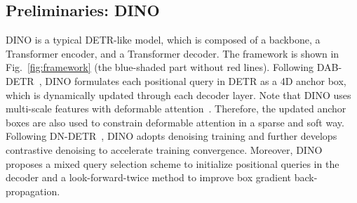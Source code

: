 \documentclass[10pt,twocolumn,letterpaper]{article}
\begin{document}
\subsection{Preliminaries: DINO}
DINO is a typical DETR-like model, which is composed of a backbone, a Transformer encoder, and a Transformer decoder. The framework is shown in Fig.~\ref{fig:framework} (the blue-shaded part without red lines). Following DAB-DETR~\cite{liu2022dab}, DINO formulates each positional query in DETR as a 4D anchor box, which is dynamically updated through each decoder layer. Note that DINO uses multi-scale features with deformable attention~\cite{zhu2020deformable}. Therefore, the updated anchor boxes are also used to constrain deformable attention in a sparse and soft way. Following DN-DETR~\cite{li2022dn}, DINO adopts denoising training and further develops contrastive denoising to accelerate training convergence. Moreover, DINO proposes a mixed query selection scheme to initialize positional queries in the decoder and a look-forward-twice method to improve box gradient back-propagation.
\end{document}
